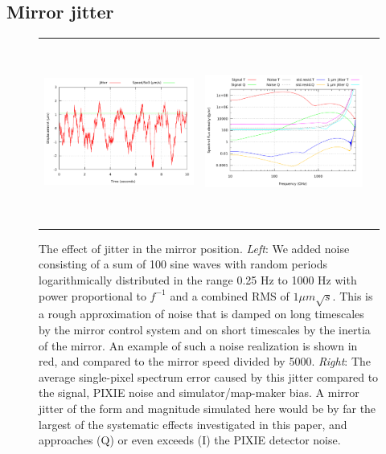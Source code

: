 \documentclass{article}
\begin{document}
\subsection{Mirror jitter}
\begin{figure}
	\centering
	\hspace*{-5mm}\begin{tabular}{ccc}
		\includegraphics[height=57mm,clip,trim=0 0 5mm 0]{plots/jit_wave_noise_realization.pdf} &
		\includegraphics[height=60mm,clip,trim=0 0 6mm 0]{plots/jitter_abs_log_log.pdf}
	\end{tabular}
	\caption{The effect of jitter in the mirror position. \emph{Left}:
	We added noise consisting of a sum of 100 sine waves with random
	periods logarithmically distributed in the range 0.25 Hz to 1000 Hz
	with power proportional to $f^{-1}$ and a combined RMS of $1\mu
	m\sqrt{s}$. This is a rough approximation of noise that is damped
	on long timescales by the mirror control system and on short timescales
	by the inertia of the mirror. An example of such a noise realization
	is shown in red,
	and compared to the mirror speed divided by 5000. \emph{Right}:
	The average single-pixel spectrum error caused by this jitter
	compared to the signal, PIXIE noise and simulator/map-maker bias.
	A mirror jitter of the form and magnitude simulated here would be
	by far the largest of the systematic effects investigated in this
	paper, and approaches (Q) or even exceeds (I) the PIXIE detector
	noise.}
\end{figure}
\end{document}

